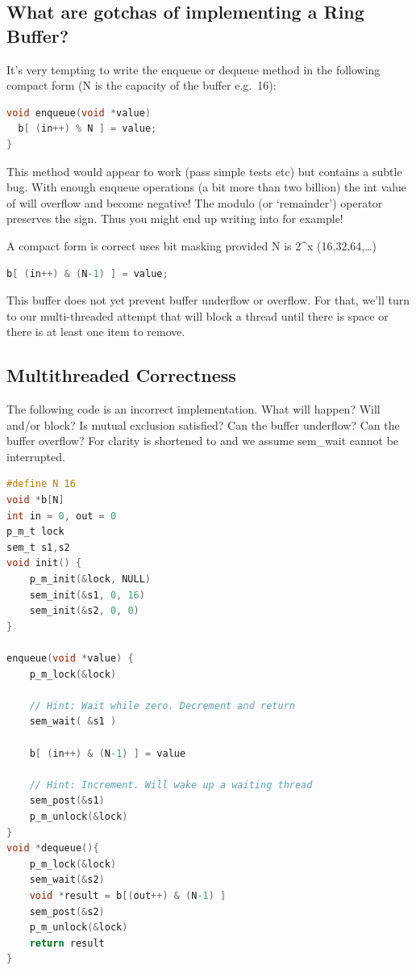 \subsection{What are gotchas of implementing a Ring Buffer?}\label{what-are-gotchas-of-implementing-a-ring-buffer}

It's very tempting to write the enqueue or dequeue method in the following compact form (N is the capacity of the buffer e.g.~16):

\begin{lstlisting}[language=C]
void enqueue(void *value)
  b[ (in++) % N ] = value;
}
\end{lstlisting}

This method would appear to work (pass simple tests etc) but contains a subtle bug. With enough enqueue operations (a bit more than two billion) the int value of  will overflow and become negative! The modulo (or `remainder') operator \keyword{\%} preserves the sign. Thus you might end up writing into  for example!

A compact form is correct uses bit masking provided N is 2\^{}x (16,32,64,\ldots{})

\begin{lstlisting}[language=C]
b[ (in++) & (N-1) ] = value;
\end{lstlisting}

This buffer does not yet prevent buffer underflow or overflow. For that, we'll turn to our multi-threaded attempt that will block a thread until there is space or there is at least one item to remove.


\subsection{Multithreaded Correctness}\label{checking-a-multi-threaded-implementation-for-correctness-example-1}

The following code is an incorrect implementation. What will happen? Will  and/or  block? Is mutual exclusion satisfied? Can the buffer underflow? Can the buffer overflow? For clarity  is shortened to  and we assume sem\_wait cannot be interrupted.

\begin{lstlisting}[language=C]
#define N 16
void *b[N]
int in = 0, out = 0
p_m_t lock
sem_t s1,s2
void init() { 
    p_m_init(&lock, NULL)
    sem_init(&s1, 0, 16)
    sem_init(&s2, 0, 0)
}

enqueue(void *value) {
    p_m_lock(&lock)

    // Hint: Wait while zero. Decrement and return
    sem_wait( &s1 ) 
 
    b[ (in++) & (N-1) ] = value

    // Hint: Increment. Will wake up a waiting thread 
    sem_post(&s1) 
    p_m_unlock(&lock)
}
void *dequeue(){
    p_m_lock(&lock)
    sem_wait(&s2)
    void *result = b[(out++) & (N-1) ]
    sem_post(&s2)
    p_m_unlock(&lock)
    return result
}
\end{lstlisting}

